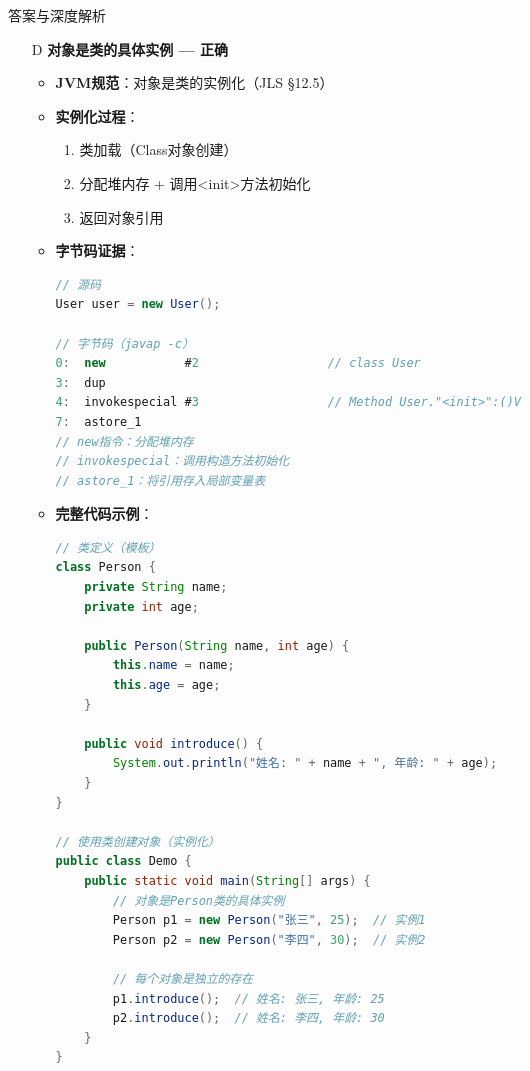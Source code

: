 \documentclass[12pt, a4paper]{ctexart}
\begin{document}
\begin{enumerate}[label=\textbf{\arabic*.}]
\begin{bluebox}{答案与深度解析}
\begin{itemize}[leftmargin=*, nosep, label={}]
			      \item[D] \textbf{对象是类的具体实例 — 正确}
			            \begin{itemize}[label={}, leftmargin=*, nosep]
				            \item \textbf{JVM规范}：对象是类的实例化（JLS §12.5）
				            \item \textbf{实例化过程}：
				                  \begin{enumerate}[label={}, nosep]
					                  \item 类加载（Class对象创建）
					                  \item 分配堆内存 + 调用<init>方法初始化
					                  \item 返回对象引用
				                  \end{enumerate}
				            \item \textbf{字节码证据}：
				                  \begin{lstlisting}[language=Java]
// 源码
User user = new User();

// 字节码（javap -c）
0:  new           #2                  // class User
3:  dup
4:  invokespecial #3                  // Method User."<init>":()V
7:  astore_1
// new指令：分配堆内存
// invokespecial：调用构造方法初始化
// astore_1：将引用存入局部变量表
				            \end{lstlisting}
				            \item \textbf{完整代码示例}：
				                  \begin{lstlisting}[language=Java]
// 类定义（模板）
class Person {
    private String name;
    private int age;

    public Person(String name, int age) {
        this.name = name;
        this.age = age;
    }

    public void introduce() {
        System.out.println("姓名: " + name + ", 年龄: " + age);
    }
}

// 使用类创建对象（实例化）
public class Demo {
    public static void main(String[] args) {
        // 对象是Person类的具体实例
        Person p1 = new Person("张三", 25);  // 实例1
        Person p2 = new Person("李四", 30);  // 实例2

        // 每个对象是独立的存在
        p1.introduce();  // 姓名: 张三, 年龄: 25
        p2.introduce();  // 姓名: 李四, 年龄: 30
    }
}
				            \end{lstlisting}
			            \end{itemize}
		      \end{itemize}


\end{bluebox}
\end{enumerate}
\end{document}
